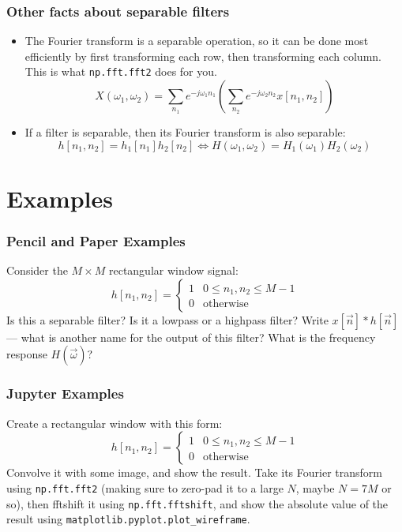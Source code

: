 \documentclass{beamer}
\begin{document}
\begin{frame}
  \frametitle{Other facts about separable filters}

  \begin{itemize}
  \item The Fourier transform is a separable operation, so it can be
    done most efficiently by first transforming each row, then
    transforming each column.  This is what \texttt{np.fft.fft2} does for
    you.
    \[
    X(\omega_1,\omega_2) = \sum_{n_1} e^{-j\omega_1 n_1}\left(\sum_{n_2} e^{-j\omega_2 n_2} x[n_1,n_2]\right)
    \]
  \item If a filter is separable, then its Fourier transform is also separable:
    \[
    h[n_1,n_2]=h_1[n_1]h_2[n_2] \Leftrightarrow
    H(\omega_1,\omega_2)=H_1(\omega_1)H_2(\omega_2)
    \]
  \end{itemize}
\end{frame}


\section{Examples}
\setcounter{subsection}{1}

\begin{frame}
  \frametitle{Pencil and Paper Examples}

  Consider the $M\times M$ rectangular window signal:
  \begin{displaymath}
    h[n_1,n_2] = \begin{cases}
      1 & 0\le n_1,n_2 \le M-1\\
      0 & \mbox{otherwise}
    \end{cases}
  \end{displaymath}
  Is this a separable filter?  Is it a lowpass or a highpass filter?
  Write $x[\vec{n}]\ast h[\vec{n}]$ --- what is another name for the
  output of this filter?
  What is the frequency response $H(\vec\omega)$?
\end{frame}

\begin{frame}
  \frametitle{Jupyter Examples}

  Create a rectangular window with this form:
  \begin{displaymath}
    h[n_1,n_2] = \begin{cases}
      1 & 0\le n_1,n_2 \le M-1\\
      0 & \mbox{otherwise}
    \end{cases}
  \end{displaymath}
  Convolve it with some image, and show the result.  Take its Fourier
  transform using \texttt{np.fft.fft2} (making sure to zero-pad it to
  a large $N$, maybe $N=7M$ or so), then fftshift it using
  \texttt{np.fft.fftshift}, and show the absolute value of the result
  using \texttt{matplotlib.pyplot.plot\_wireframe}.
\end{frame}
\end{document}
